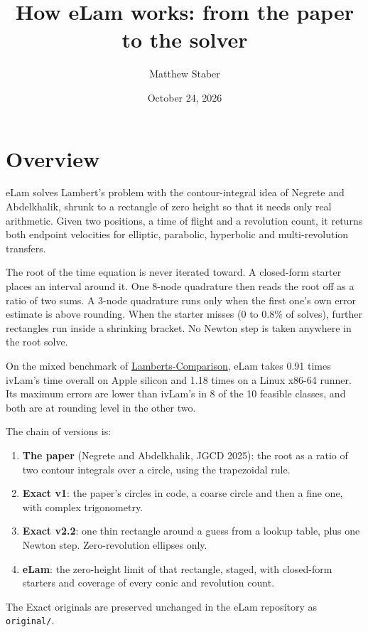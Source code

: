 \documentclass[11pt]{article}
\title{How eLam works: from the paper to the solver}
\author{Matthew Staber}
\date{October 24, 2026}
\newcommand{\code}[1]{\texttt{#1}}
\begin{document}
\maketitle

\section{Overview}

eLam solves Lambert's problem with the contour-integral idea of Negrete and Abdelkhalik, shrunk to a rectangle of zero height so that it needs only real arithmetic. Given two positions, a time of flight and a revolution count, it returns both endpoint velocities for elliptic, parabolic, hyperbolic and multi-revolution transfers.

The root of the time equation is never iterated toward. A closed-form starter places an interval around it. One 8-node quadrature then reads the root off as a ratio of two sums. A 3-node quadrature runs only when the first one's own error estimate is above rounding. When the starter misses (0 to 0.8\% of solves), further rectangles run inside a shrinking bracket. No Newton step is taken anywhere in the root solve.

On the mixed benchmark of \href{https://github.com/Ossama-Abdelkhalik-Lab/Lamberts-Comparison}{Lamberts-Comparison}, eLam takes 0.91 times ivLam's time overall on Apple silicon and 1.18 times on a Linux x86-64 runner. Its maximum errors are lower than ivLam's in 8 of the 10 feasible classes, and both are at rounding level in the other two.

The chain of versions is:
\begin{enumerate}
  \item \textbf{The paper} (Negrete and Abdelkhalik, JGCD 2025): the root as a ratio of two contour integrals over a circle, using the trapezoidal rule.
  \item \textbf{Exact v1}: the paper's circles in code, a coarse circle and then a fine one, with complex trigonometry.
  \item \textbf{Exact v2.2}: one thin rectangle around a guess from a lookup table, plus one Newton step. Zero-revolution ellipses only.
  \item \textbf{eLam}: the zero-height limit of that rectangle, staged, with closed-form starters and coverage of every conic and revolution count.
\end{enumerate}
The Exact originals are preserved unchanged in the eLam repository as \code{original/}.
\end{document}
